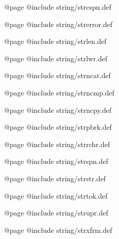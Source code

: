 @page
@include string/strcspn.def

@page
@include string/strerror.def

@page
@include string/strlen.def

@page
@include string/strlwr.def

@page
@include string/strncat.def

@page
@include string/strncmp.def

@page
@include string/strncpy.def

@page
@include string/strpbrk.def

@page
@include string/strrchr.def

@page
@include string/strspn.def

@page
@include string/strstr.def

@page
@include string/strtok.def

@page
@include string/strupr.def

@page
@include string/strxfrm.def
